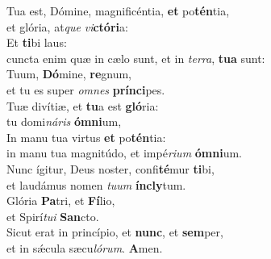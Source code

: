 \evenverse Tua est, Dómine, magnificéntia, \textbf{et} po\textbf{tén}tia,~\*\\
\evenverse et glória, at\textit{que} \textit{vi}\textbf{ctó}\textbf{ri}a:\\
\oddverse Et \textbf{ti}bi laus:~\*\\
\oddverse cuncta enim quæ in cælo sunt, et in \textit{ter}\textit{ra}, \textbf{tu}\textbf{a} sunt:\\
\evenverse Tuum, \textbf{Dó}mine, \textbf{re}gnum,~\*\\
\evenverse et tu es super \textit{om}\textit{nes} \textbf{prín}\textbf{ci}pes.\\
\oddverse Tuæ divítiæ, et \textbf{tu}a est \textbf{gló}ria:~\*\\
\oddverse tu domi\textit{ná}\textit{ris} \textbf{óm}\textbf{ni}um,\\
\evenverse In manu tua virtus \textbf{et} po\textbf{tén}tia:~\*\\
\evenverse in manu tua magnitúdo, et impé\textit{ri}\textit{um} \textbf{óm}\textbf{ni}um.\\
\oddverse Nunc ígitur, Deus noster, confi\textbf{té}mur \textbf{ti}bi,~\*\\
\oddverse et laudámus nomen \textit{tu}\textit{um} \textbf{ín}\textbf{cly}tum.\\
\evenverse Glória \textbf{Pa}tri, et \textbf{Fí}lio,~\*\\
\evenverse et Spirí\textit{tu}\textit{i} \textbf{San}cto.\\
\oddverse Sicut erat in princípio, et \textbf{nunc}, et \textbf{sem}per,~\*\\
\oddverse et in sǽcula sæcu\textit{ló}\textit{rum}. \textbf{A}men.\\
